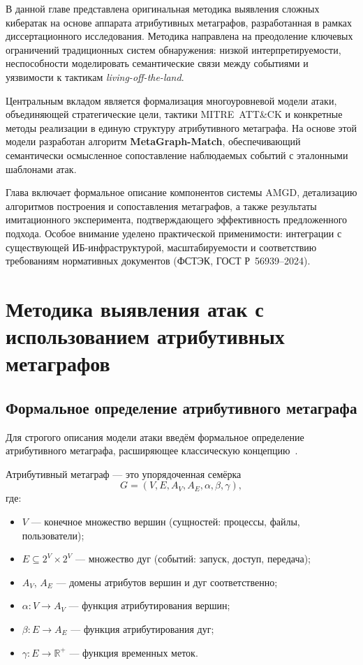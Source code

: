
В данной главе представлена оригинальная методика выявления сложных кибератак на основе аппарата атрибутивных метаграфов, разработанная в рамках диссертационного исследования. Методика направлена на преодоление ключевых ограничений традиционных систем обнаружения: низкой интерпретируемости, неспособности моделировать семантические связи между событиями и уязвимости к тактикам \textit{living-off-the-land}. 

Центральным вкладом является формализация многоуровневой модели атаки, объединяющей стратегические цели, тактики MITRE~ATT\&CK и конкретные методы реализации в единую структуру атрибутивного метаграфа. На основе этой модели разработан алгоритм \textbf{MetaGraph-Match}, обеспечивающий семантически осмысленное сопоставление наблюдаемых событий с эталонными шаблонами атак. 

Глава включает формальное описание компонентов системы AMGD, детализацию алгоритмов построения и сопоставления метаграфов, а также результаты имитационного эксперимента, подтверждающего эффективность предложенного подхода. Особое внимание уделено практической применимости: интеграции с существующей ИБ-инфраструктурой, масштабируемости и соответствию требованиям нормативных документов (ФСТЭК, ГОСТ Р~56939–2024).

\chapter{Методика выявления атак с использованием атрибутивных метаграфов}\label{ch:ch3}

\section{Формальное определение атрибутивного метаграфа}\label{sec:ch3/formal}

Для строгого описания модели атаки введём формальное определение атрибутивного метаграфа, расширяющее классическую концепцию~\cite{Basu2018}.

\begin{definition}
Атрибутивный метаграф — это упорядоченная семёрка
\[
G = (V, E, A_V, A_E, \alpha, \beta, \gamma),
\]
где:
\begin{itemize}
    \item $V$ — конечное множество вершин (сущностей: процессы, файлы, пользователи);
    \item $E \subseteq 2^V \times 2^V$ — множество дуг (событий: запуск, доступ, передача);
    \item $A_V$, $A_E$ — домены атрибутов вершин и дуг соответственно;
    \item $\alpha: V \to A_V$ — функция атрибутирования вершин;
    \item $\beta: E \to A_E$ — функция атрибутирования дуг;
    \item $\gamma: E \to \mathbb{R}^+$ — функция временных меток.
\end{itemize}
\end{definition}


